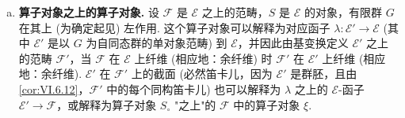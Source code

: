 \begin{enumerate}[a)]
余纤维范畴 $\mathcal{P}$ 可以由更一般的余纤维 (或更确切地说纤维) 范畴推出，后者如下得到. 对每个范畴 $\mathcal{U}$ (在固定宇宙中)，令
\[
\mathcal{P}(\mathcal{U}) = \operatorname{Hom}(\mathcal{U}, \mathcal{C})
\]
并注意 $\mathcal{U} \mapsto \mathcal{P}(\mathcal{U})$ 自然地是 Cat 到 Cat 的 $U$ 的反变函子. 它因此定义 $\mathcal{E} = \mathbf{Cat}$ 之上的分裂范畴，记为 $\mathbf{Cat}_{//\mathcal{C}}$. 该范畴的对象是范畴 $\mathcal{U}$ 和函子 $p \colon \mathcal{U} \to \mathcal{C}$ 组成的对 $(\mathcal{U}, p)$，$(\mathcal{U}, p)$ 到 $(\mathcal{V}, q)$ 的态射本质上是函子 $f \colon \mathcal{U} \to \mathcal{V}$ 和函子同态 $u \colon p \to qf$ 组成的对 $(f, u)$. 把 $\mathbf{Cat}_{//\mathcal{C}}$ 中态射的复合明确留给读者. 投影函子
\[
\mathcal{F} = \mathrm{Cat}_{//\mathcal{C}} \longrightarrow \mathcal{E} = \mathrm{Cat}
\]
给对 $(\mathcal{U}, p)$ 配对象 $\mathcal{U}$；在 $\mathcal{U}$ 处的纤维范畴是范畴 Hom$(\mathcal{U}, \mathcal{C})$ (在同构意义下). 当 $\mathcal{C}$ 中存在归纳极限时，容易证明 Cat 之上的纤维范畴 $\mathbf{Cat}_{//\mathcal{C}}$ 在 Cat 上也是余纤维的，i.e. 可以定义函子 $p \colon \mathcal{U} \to \mathcal{C}$ 经函子 $f \colon \mathcal{U} \to \mathcal{V}$ 的正像概念. 预层范畴由上述纤维范畴经基变换
\[
\mathbf{Top}^{\circ} \longrightarrow \mathbf{Cat}
\]
(前面定义的函子 $S \mapsto \mathcal{U}(S)$) 推出，得到 $\mathbf{Top}^{\circ}$ 之上的纤维范畴，取对偶范畴得到 Top 之上的预层余纤维范畴 $\mathcal{P}$. 函子的逆像概念对应预层的正像概念，函子的正像概念对应预层的逆像概念.

\item \textbf{算子对象之上的算子对象.} 设 $\mathcal{F}$ 是 $\mathcal{E}$ 之上的范畴，$S$ 是 $\mathcal{E}$ 的对象，有限群 $G$ 在其上 (为确定起见) 左作用. 这个算子对象可以解释为对应函子 $\lambda \colon \mathcal{E}' \to \mathcal{E}$ (其中 $\mathcal{E}'$ 是以 $G$ 为自同态群的单对象范畴) 到 $\mathcal{E}$，并因此由基变换定义 $\mathcal{E}'$ 之上的范畴 $\mathcal{F}'$，当 $\mathcal{F}$ 在 $\mathcal{E}$ 上纤维 (相应地：余纤维) 时 $\mathcal{F}'$ 在 $\mathcal{E}'$ 上纤维 (相应地：余纤维). $\mathcal{E}'$ 在 $\mathcal{F}'$ 上的截面 (必然笛卡儿，因为 $\mathcal{E}'$ 是群胚，且由 \ref{cor:VI.6.12}，$\mathcal{F}'$ 中的每个同构笛卡儿) 也可以解释为 $\lambda$ 之上的 $\mathcal{E}$-函子 $\mathcal{E}' \to \mathcal{F}$，或解释为算子对象 $S_{\circ}$ "之上"的 $\mathcal{F}$ 中的算子对象 $\xi$.


\end{enumerate}
